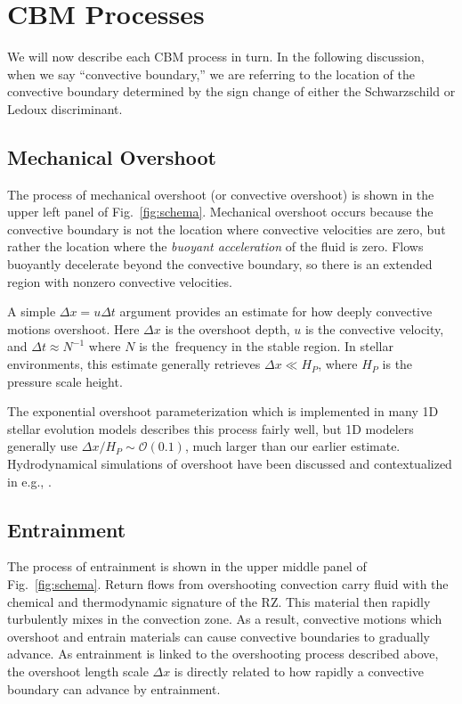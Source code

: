 \section{CBM Processes}
\label{sec:processes}

We will now describe each CBM process in turn.
In the following discussion, when we say ``convective boundary,'' we are referring to the location of the convective boundary determined by the sign change of either the Schwarzschild or Ledoux discriminant.

\subsection{Mechanical Overshoot}
The process of mechanical overshoot (or convective overshoot) is shown in the upper left panel of Fig.~\ref{fig:schema}.
Mechanical overshoot occurs because the convective boundary is not the location where convective velocities are zero, but rather the location where the \emph{buoyant acceleration} of the fluid is zero.
Flows buoyantly decelerate beyond the convective boundary, so there is an extended region with nonzero convective velocities.

A simple $\Delta x = u \Delta t$ argument provides an estimate for how deeply convective motions overshoot.
Here $\Delta x$ is the overshoot depth, $u$ is the convective velocity, and $\Delta t \approx N^{-1}$ where $N$ is the \brunt$\,$frequency in the stable region.
In stellar environments, this estimate generally retrieves $\Delta x \ll H_P$, where $H_P$ is the pressure scale height.

The exponential overshoot parameterization \citep[per e.g.,][]{herwig_2000} which is implemented in many 1D stellar evolution models describes this process fairly well, but 1D modelers generally use $\Delta x/H_P \sim \mathcal{O}(0.1)$, much larger than our earlier estimate.
Hydrodynamical simulations of overshoot have been discussed and contextualized in e.g., \citet{korre_etal_2019}.


\subsection{Entrainment}
The process of entrainment is shown in the upper middle panel of Fig.~\ref{fig:schema}.
Return flows from overshooting convection carry fluid with the chemical and thermodynamic signature of the RZ.
This material then rapidly turbulently mixes in the convection zone.
As a result, convective motions which overshoot and entrain materials can cause convective boundaries to gradually advance.
As entrainment is linked to the overshooting process described above, the overshoot length scale $\Delta x$ is directly related to how rapidly a convective boundary can advance by entrainment.

